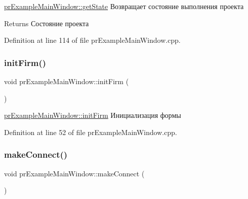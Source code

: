 \hyperlink{classpr_example_main_window_accee9261c93ec98afa66d5e51642a34e}{pr\+Example\+Main\+Window\+::get\+State} Возвращает состояние выполнения проекта 

\begin{DoxyReturn}{Returns}
Состояние проекта 
\end{DoxyReturn}


Definition at line 114 of file pr\+Example\+Main\+Window.\+cpp.

\mbox{\label{classpr_example_main_window_a4101c3f2b8ee5c1a33b3efc303993b7e}} 
\subsubsection{\texorpdfstring{init\+Firm()}{initFirm()}}
{\footnotesize\ttfamily void pr\+Example\+Main\+Window\+::init\+Firm (\begin{DoxyParamCaption}{ }\end{DoxyParamCaption})\hspace{0.3cm}{\ttfamily [private]}}



\hyperlink{classpr_example_main_window_a4101c3f2b8ee5c1a33b3efc303993b7e}{pr\+Example\+Main\+Window\+::init\+Firm} Инициализация формы 



Definition at line 52 of file pr\+Example\+Main\+Window.\+cpp.

\mbox{\label{classpr_example_main_window_a05eb7e290281288b56ac087490bcd191}} 
\subsubsection{\texorpdfstring{make\+Connect()}{makeConnect()}}
{\footnotesize\ttfamily void pr\+Example\+Main\+Window\+::make\+Connect (\begin{DoxyParamCaption}{ }\end{DoxyParamCaption})\hspace{0.3cm}{\ttfamily [private]}}



